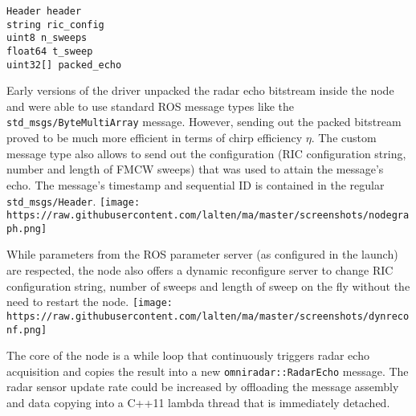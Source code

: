 \begin{verbatim}
Header header
string ric_config
uint8 n_sweeps
float64 t_sweep
uint32[] packed_echo
\end{verbatim}

Early versions of the driver unpacked the radar echo bitstream inside
the node and were able to use standard ROS message types like the
\texttt{std\_msgs/ByteMultiArray} message. However, sending out the
packed bitstream proved to be much more efficient in terms of chirp
efficiency \(\eta\). The custom message type also allows to send out the
configuration (RIC configuration string, number and length of FMCW
sweeps) that was used to attain the message's echo. The message's
timestamp and sequential ID is contained in the regular
\texttt{std\_msgs/Header}.
\texttt{[image: https://raw.githubusercontent.com/lalten/ma/master/screenshots/nodegraph.png]}

While parameters from the ROS parameter server (as configured in the
launch) are respected, the node also offers a dynamic reconfigure server
to change RIC configuration string, number of sweeps and length of sweep
on the fly without the need to restart the node.
\texttt{[image: https://raw.githubusercontent.com/lalten/ma/master/screenshots/dynreconf.png]}

The core of the node is a while loop that continuously triggers radar
echo acquisition and copies the result into a new
\texttt{omniradar::RadarEcho} message. The radar sensor update rate
could be increased by offloading the message assembly and data copying
into a C++11 lambda thread that is immediately detached.

\begin{Shaded}
\begin{Highlighting}[]

\NormalTok{    [=] ()}
\NormalTok{    \{}
\NormalTok{    \}}
\NormalTok{);}
\end{Highlighting}
\end{Shaded}

